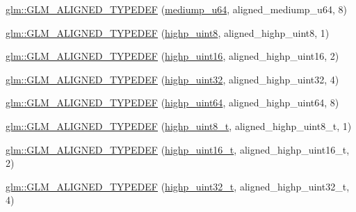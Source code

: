 \begin{DoxyCompactItemize}
\hyperlink{group__gtx__type__aligned_gaa0fc531cbaa972ac3a0b86d21ef4a7fa}{glm\+::\+G\+L\+M\+\_\+\+A\+L\+I\+G\+N\+E\+D\+\_\+\+T\+Y\+P\+E\+D\+EF} (\hyperlink{group__gtc__type__precision_ga00c51a16fa190b0a90205d50d6d8a44a}{mediump\+\_\+u64}, aligned\+\_\+mediump\+\_\+u64, 8)
\item 
\hyperlink{group__gtx__type__aligned_ga0ee829f7b754b262bbfe6317c0d678ac}{glm\+::\+G\+L\+M\+\_\+\+A\+L\+I\+G\+N\+E\+D\+\_\+\+T\+Y\+P\+E\+D\+EF} (\hyperlink{group__gtc__type__precision_ga2c27c6dd26e893786f04b10f99c1ee95}{highp\+\_\+uint8}, aligned\+\_\+highp\+\_\+uint8, 1)
\item 
\hyperlink{group__gtx__type__aligned_ga447848a817a626cae08cedc9778b331c}{glm\+::\+G\+L\+M\+\_\+\+A\+L\+I\+G\+N\+E\+D\+\_\+\+T\+Y\+P\+E\+D\+EF} (\hyperlink{group__gtc__type__precision_ga4d32967d45ba8365e2a05eaaac85e978}{highp\+\_\+uint16}, aligned\+\_\+highp\+\_\+uint16, 2)
\item 
\hyperlink{group__gtx__type__aligned_ga6027ae13b2734f542a6e7beee11b8820}{glm\+::\+G\+L\+M\+\_\+\+A\+L\+I\+G\+N\+E\+D\+\_\+\+T\+Y\+P\+E\+D\+EF} (\hyperlink{group__gtc__type__precision_ga3145e44c73e2df7dfe4f3cb65974bf22}{highp\+\_\+uint32}, aligned\+\_\+highp\+\_\+uint32, 4)
\item 
\hyperlink{group__gtx__type__aligned_ga2aca46c8608c95ef991ee4c332acde5f}{glm\+::\+G\+L\+M\+\_\+\+A\+L\+I\+G\+N\+E\+D\+\_\+\+T\+Y\+P\+E\+D\+EF} (\hyperlink{group__gtc__type__precision_ga8079c653e20cda03d34b99de629a7b09}{highp\+\_\+uint64}, aligned\+\_\+highp\+\_\+uint64, 8)
\item 
\hyperlink{group__gtx__type__aligned_gaff50b10dd1c48be324fdaffd18e2c7ea}{glm\+::\+G\+L\+M\+\_\+\+A\+L\+I\+G\+N\+E\+D\+\_\+\+T\+Y\+P\+E\+D\+EF} (\hyperlink{group__gtc__type__precision_ga9ba529fcc75b82d23da979f0ce6e4518}{highp\+\_\+uint8\+\_\+t}, aligned\+\_\+highp\+\_\+uint8\+\_\+t, 1)
\item 
\hyperlink{group__gtx__type__aligned_ga9fc4421dbb833d5461e6d4e59dcfde55}{glm\+::\+G\+L\+M\+\_\+\+A\+L\+I\+G\+N\+E\+D\+\_\+\+T\+Y\+P\+E\+D\+EF} (\hyperlink{group__gtc__type__precision_ga3145bc0ee80432c165e985a188a722b3}{highp\+\_\+uint16\+\_\+t}, aligned\+\_\+highp\+\_\+uint16\+\_\+t, 2)
\item 
\hyperlink{group__gtx__type__aligned_ga329f1e2b94b33ba5e3918197030bcf03}{glm\+::\+G\+L\+M\+\_\+\+A\+L\+I\+G\+N\+E\+D\+\_\+\+T\+Y\+P\+E\+D\+EF} (\hyperlink{group__gtc__type__precision_ga8eb85ad460079c63b68866ae34637bda}{highp\+\_\+uint32\+\_\+t}, aligned\+\_\+highp\+\_\+uint32\+\_\+t, 4)
\item 

\end{DoxyCompactItemize}

